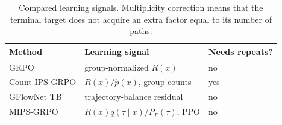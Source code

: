 \begin{table}[t]
\centering
\caption{Compared learning signals. Multiplicity correction means that the
terminal target does not acquire an extra factor equal to its number of paths.}
\label{tab:methods}
\begin{tabular}{lll}
\toprule
Method & Learning signal & Needs repeats? \\
\midrule
GRPO & group-normalized \(R(x)\) & no \\
Count IPS-GRPO & \(R(x)/\hat p(x)\), group counts & yes \\
GFlowNet TB & trajectory-balance residual & no \\
MIPS-GRPO & \(R(x)q(\tau\mid x)/P_F(\tau)\), PPO & no \\
\bottomrule
\end{tabular}
\end{table}

